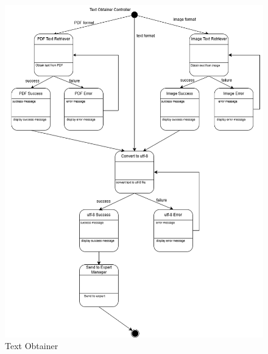 \begin{figure}[H]
	\centering
	\includegraphics[width=\textwidth, height=\textheight]{Section2/images/text_obtainer_state_diagram.png}
	\caption{Text Obtainer}
	\label{TextObtainer}
\end{figure}